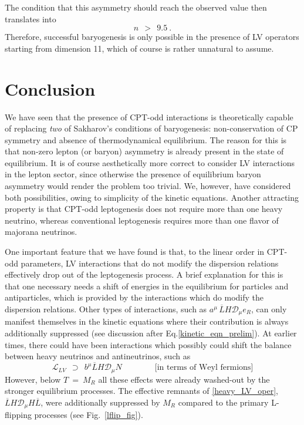 \documentclass[12pt]{revtex4}
\newcommand{\md}{\mathcal{D}}
\newcommand{\ov}{\overline}
\begin{document}
	The condition that this asymmetry should reach the observed value then translates
	into
\[
	n~~>~~9.5~.
\]
	Therefore, successful baryogenesis is only possible in the presence of LV operators
	starting from dimension 11, which of course is rather 
	unnatural to assume.


%
%
\section{Conclusion}

	We have seen that the presence of CPT-odd interactions is theoretically capable
	of replacing \emph{two} of Sakharov's conditions of baryogenesis: non-conservation 
	of CP symmetry and absence of thermodynamical equilibrium. 
	The reason for this is that non-zero lepton (or baryon) asymmetry is already present 
	in the state of equilibrium.
	It is of course aesthetically more correct to consider LV interactions in the 
	lepton sector,
	since otherwise the presence of equilibrium baryon asymmetry would render the 
	problem too trivial.
	We, however, have considered both possibilities, owing to  simplicity of the kinetic
	equations.
	Another attracting property is that CPT-odd leptogenesis does not require more than
	one heavy neutrino, whereas conventional leptogenesis requires more than one flavor
	of majorana neutrinos.

	One important feature that we have found is that, to the linear order in CPT-odd 
	parameters, LV interactions that do not modify the dispersion relations effectively 
	drop out of the leptogenesis process.
	A brief explanation for this is that one necessary needs a shift of energies
	in the equilibrium for particles and antiparticles, which is provided by the 
	interactions which do modify the dispersion relations. 
	Other types of interactions, such as $ a^\mu\, \ov{L}H \md_\mu e_R $,
	can only manifest themselves in the kinetic equations where their contribution
	is always additionally suppressed 
	(see discussion after Eq.\eqref{kinetic_eqn_prelim}).
	At earlier times, there could have been interactions which possibly could 
	shift the balance between heavy neutrinos and antineutrinos, such as 
\begin{equation}
\label{heavy_LV_oper}
	\mathcal{L}_{LV} ~~\supset~~
	 b^\mu \ov{L} H \md_\mu N \qquad\qquad \text{[in terms of Weyl fermions]}
\end{equation}
	However, below $ T ~=~ M_R $ all these effects
	were already washed-out by the stronger equilibrium processes.
	The effective remnants of \eqref{heavy_LV_oper}, $ \ov{L}H \md_\mu H \ov{L} $, 
	were additionally suppressed by $ M_R $ compared to the primary L-flipping processes
	(see Fig.~\ref{lflip_fig}).
	
\end{document}

